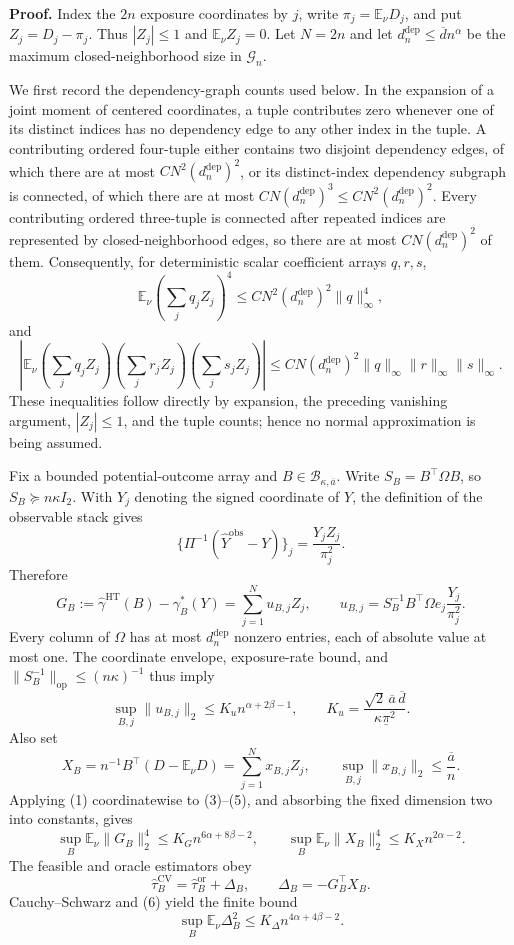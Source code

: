 \textbf{Proof.}
Index the \(2n\) exposure coordinates by \(j\), write \(\pi_j=\mathbb E_\nu D_j\), and put \(Z_j=D_j-\pi_j\).  Thus \(|Z_j|\leq1\) and \(\mathbb E_\nu Z_j=0\).  Let \(N=2n\) and let \(d_n^{\mathrm{dep}}\leq\overline d n^\alpha\) be the maximum closed-neighborhood size in \(\mathcal G_n\).

We first record the dependency-graph counts used below.  In the expansion of a joint moment of centered coordinates, a tuple contributes zero whenever one of its distinct indices has no dependency edge to any other index in the tuple.  A contributing ordered four-tuple either contains two disjoint dependency edges, of which there are at most \(C N^2(d_n^{\mathrm{dep}})^2\), or its distinct-index dependency subgraph is connected, of which there are at most \(C N(d_n^{\mathrm{dep}})^3\le C N^2(d_n^{\mathrm{dep}})^2\).  Every contributing ordered three-tuple is connected after repeated indices are represented by closed-neighborhood edges, so there are at most \(C N(d_n^{\mathrm{dep}})^2\) of them.  Consequently, for deterministic scalar coefficient arrays \(q,r,s\),
\[
 \mathbb E_\nu\!\left(\sum_jq_jZ_j\right)^4
 \leq C N^2(d_n^{\mathrm{dep}})^2\lVert q\rVert_\infty^4,
 \tag{1}
\]
and
\[
 \left|\mathbb E_\nu
 \left(\sum_jq_jZ_j\right)
 \left(\sum_jr_jZ_j\right)
 \left(\sum_js_jZ_j\right)\right|
 \leq C N(d_n^{\mathrm{dep}})^2
 \lVert q\rVert_\infty\lVert r\rVert_\infty\lVert s\rVert_\infty.
 \tag{2}
\]
These inequalities follow directly by expansion, the preceding vanishing argument, \(|Z_j|\leq1\), and the tuple counts; hence no normal approximation is being assumed.

Fix a bounded potential-outcome array and \(B\in\mathcal B_{\kappa,\overline a}\).  Write \(S_B=B^\top\Omega B\), so \(S_B\succeq n\kappa I_2\).  With \(Y_j\) denoting the signed coordinate of \(Y\), the definition of the observable stack gives
\[
 \{\Pi^{-1}(\widehat Y^{\mathrm{obs}}-Y)\}_j
 =\frac{Y_jZ_j}{\pi_j^2}.
\]
Therefore
\[
 G_B:=\widehat\gamma^{\mathrm{HT}}(B)-\gamma_B^*(Y)
 =\sum_{j=1}^{N}u_{B,j}Z_j,
 \qquad
 u_{B,j}=S_B^{-1}B^\top\Omega e_j\frac{Y_j}{\pi_j^2}.
 \tag{3}
\]
Every column of \(\Omega\) has at most \(d_n^{\mathrm{dep}}\) nonzero entries, each of absolute value at most one.  The coordinate envelope, exposure-rate bound, and \(\lVert S_B^{-1}\rVert_{\mathrm{op}}\leq(n\kappa)^{-1}\) thus imply
\[
 \sup_{B,j}\lVert u_{B,j}\rVert_2
 \leq K_u n^{\alpha+2\beta-1},
 \qquad
 K_u=\frac{\sqrt2\,\overline a\,\overline d}{\kappa\underline\pi^2}.
 \tag{4}
\]
Also set
\[
 X_B=n^{-1}B^\top(D-\mathbb E_\nu D)
 =\sum_{j=1}^{N}x_{B,j}Z_j,
 \qquad
 \sup_{B,j}\lVert x_{B,j}\rVert_2\leq\frac{\overline a}{n}.
 \tag{5}
\]
Applying (1) coordinatewise to (3)--(5), and absorbing the fixed dimension two into constants, gives
\[
 \sup_B\mathbb E_\nu\lVert G_B\rVert_2^4
 \leq K_G n^{6\alpha+8\beta-2},
 \qquad
 \sup_B\mathbb E_\nu\lVert X_B\rVert_2^4
 \leq K_X n^{2\alpha-2}.
 \tag{6}
\]
The feasible and oracle estimators obey
\[
 \widehat\tau_B^{\mathrm{CV}}
 =\widehat\tau_B^{\mathrm{or}}+\Delta_B,
 \qquad
 \Delta_B=-G_B^\top X_B.
 \tag{7}
\]
Cauchy--Schwarz and (6) yield the finite bound
\[
 \sup_B\mathbb E_\nu\Delta_B^2
 \leq K_\Delta n^{4\alpha+4\beta-2}.
 \tag{8}
\]

